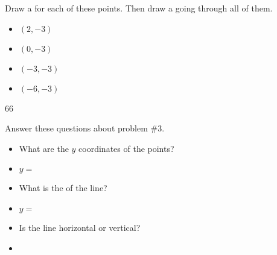 \documentclass[12pt,letterpaper]{memoir}
\begin{document}
\myProblemsWithContent
{
    Draw a  for each of these points. 
    Then draw a  going through all of them.
    \begin{itemize}[nosep]
        \item $(2,-3)$
        \item $(0,-3)$
        \item $(-3,-3)$
        \item $(-6,-3)$
    \end{itemize}
    \vspace{-3\onelineskip}
    \hfill
    \begin{myTikzpictureGrid}{0.35} {6}{6}
    \end{myTikzpictureGrid}
}
{
    Answer these questions about problem \#3. 
    \tcblower 
    \begin{itemize}[fullwidth]
        \item[] What are the $y$ coordinates of the points? 
        \item[] $y =$\\
        \item[] What is the  of the line? 
        \item[] $y =$\\
        \item[] Is the line horizontal or vertical?
        \item[] 
    \end{itemize}
}
\end{document}
